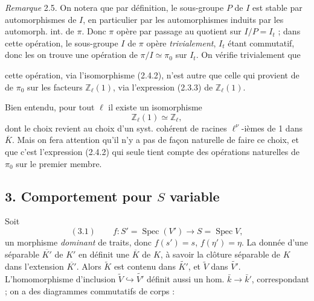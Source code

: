 \documentclass[11pt,a4paper]{article}
\begin{document}
\emph{Remarque} 2.5. On notera que par définition, le sous-groupe $P$ de $I$ est stable par \struck{\ill{}} automorphismes de $I$, en particulier par les automorphismes  induits par les automorph. int. de $\pi$. Donc $\pi$ opère par passage au quotient sur $I/P = I_t$ ;   dans cette opération, le sous-groupe $I$ de $\pi$ opère \emph{trivialement}, $I_t$ étant commutatif, donc les \uncertain{\ill{}} on trouve une opération de $\pi/I \simeq \pi_0$ sur $I_t$.  On vérifie trivialement que

cette opération, via l'isomorphisme (2.4.2), \struck{\ill{}} n'est autre que celle qui provient de   de $\pi_0$ sur les facteurs $\mathbb{Z}_\ell(1)$, via l'expression (2.3.3) de $\mathbb{Z}_\ell(1)$.

Bien entendu, pour tout $\ell$ \struck{\ill{}} il existe  un isomorphisme
\[
  \mathbb{Z}_\ell(1) \simeq \mathbb{Z}_\ell ,
\]
dont le choix revient au choix d'un syst. cohérent de racines  $\ell^\nu$-ièmes de 1 dans $\overline{K}$. Mais on fera attention qu'il n'y a pas de façon naturelle de faire ce choix, et que c'est l'expression  (2.4.2) qui seule  tient compte des opérations naturelles de $\pi_0$ sur le premier membre.

\subsection*{3. Comportement pour $S$ variable}


Soit
\[
  (3.1) \qquad f : S' = \operatorname{Spec}(V') \longrightarrow S = \operatorname{Spec} V ,
\]
un morphisme \emph{dominant} de traits,  donc $f(s') = s$, $f(\eta') = \eta$. La donnée d'une   séparable \struck{\ill{}} $\overline{K'}$ de $K'$ en définit une $\overline{K}$ de $K$, à savoir la clôture séparable de $K$ dans l'extension $\overline{K'}$. Alors $\widetilde{K}$ est contenu dans $\widetilde{K'}$, et $\widetilde{V}$ dans $\widetilde{V'}$. L'homomorphisme d'inclusion $\widetilde{V} \hookrightarrow \widetilde{V'}$ définit aussi un hom. $\bar{k} \to \bar{k}'$, correspondant ; \struck{\ill{}} on a des diagrammes commutatifs de corps :
\end{document}
